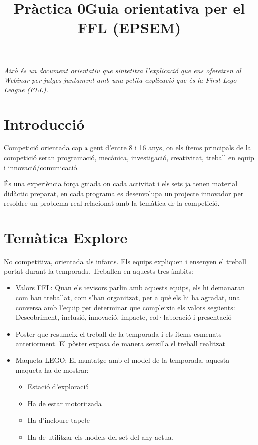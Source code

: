 \documentclass{article}
\title{Pràctica 0}
\begin{document}
\title{Guia orientativa per el FFL (EPSEM)}

\hfill
\textit{Això és un document orientatiu que sintetitza l'explicació que ens ofereixen al Webinar per jutges\cite{Webinar} juntament amb una petita explicació que és la First Lego League (FLL)\cite{FFL}.}
\hfill 

\section{Introducció}
\hfill

Competició orientada cap a gent d’entre 8 i 16 anys, on els ítems principals de la competició seran programació, mecànica, investigació, creativitat, treball en equip i innovació/comunicació. 

\hfill \break\hfill \break
És una experiència força guiada on cada activitat i els sets ja tenen material didàctic preparat, en cada programa es desenvolupa un projecte innovador per resoldre un problema real relacionat amb la temàtica de la competició.

\section{Temàtica Explore}
No competitiva, orientada als infants. Els equips expliquen i ensenyen el treball portat durant la temporada. Treballen en aquests tres àmbits:

\begin{itemize}
  \item Valors FFL: Quan els revisors parlin amb aquests equips, els hi demanaran com han treballat, com s’han organitzat, per a què els hi ha agradat, una conversa amb l’equip per determinar que compleixin els valors següents: Descobriment, inclusió, innovació, impacte, col·laboració i presentació
  \item Poster que resumeix el treball de la temporada i els ítems esmenats anteriorment. El pòster exposa de manera senzilla el treball realitzat
  \item Maqueta LEGO: El muntatge amb el model de la temporada, aquesta maqueta ha de mostrar:
  \begin{itemize}
    \item Estació d'exploració
    \item Ha de estar motoritzada
    \item Ha d'incloure tapete 
    \item Ha de utilitzar els models del set del any actual
  \end{itemize}
\end{itemize}
\end{document}
